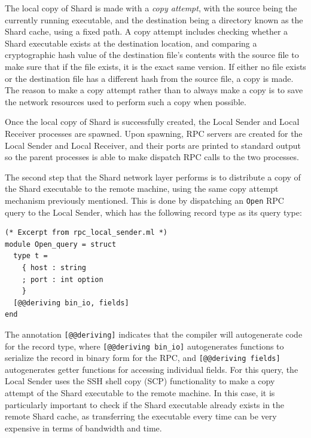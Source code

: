 \documentclass[oneside]{report}
\begin{document}
The local copy of Shard is made with a \textit{copy attempt}, with the source being the currently running executable, and the destination being a directory known as the Shard cache, using a fixed path.
A copy attempt includes checking whether a Shard executable exists at the destination location, and comparing a cryptographic hash value of the destination file's contents with the source file to make sure that if the file exists, it is the exact same version.
If either no file exists or the destination file has a different hash from the source file, a copy is made.
The reason to make a copy attempt rather than to always make a copy is to save the network resources used to perform such a copy when possible.

Once the local copy of Shard is successfully created, the Local Sender and Local Receiver processes are spawned.
Upon spawning, RPC servers are created for the Local Sender and Local Receiver, and their ports are printed to standard output so the parent processes is able to make dispatch RPC calls to the two processes.

The second step that the Shard network layer performs is to distribute a copy of the Shard executable to the remote machine, using the same copy attempt mechanism previously mentioned.
This is done by dispatching an \texttt{Open} RPC query to the Local Sender, which has the following record type as its query type:

\begin{minipage}[c]{\textwidth-15pt}
  \begin{lstlisting}
(* Excerpt from rpc_local_sender.ml *)
module Open_query = struct
  type t =
    { host : string
    ; port : int option
    }
  [@@deriving bin_io, fields]
end
\end{lstlisting}
  \smallskip
\end{minipage}

The annotation \texttt{[@@deriving]} indicates that the compiler will autogenerate code for the record type, where \texttt{[@@deriving bin\_io]} autogenerates functions to serialize the record in binary form for the RPC, and \texttt{[@@deriving fields]} autogenerates getter functions for accessing individual fields.
For this query, the Local Sender uses the SSH shell copy (SCP) functionality to make a copy attempt of the Shard executable to the remote machine.
In this case, it is particularly important to check if the Shard executable already exists in the remote Shard cache, as transferring the executable every time can be very expensive in terms of bandwidth and time.
\end{document}
